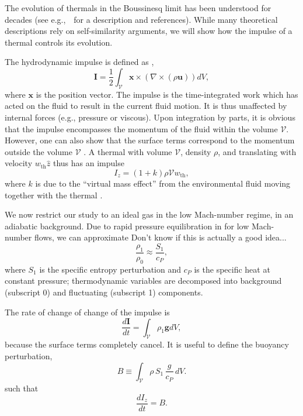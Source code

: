 \documentclass[twocolumn, amsmath, amsfonts, amssymb, trackchanges]{aastex62}
\newcommand{\grad}{\ensuremath{\nabla}}
\newcommand{\dl}[1]{{\color{blue} #1}}
\newcommand{\LJ}{\citetalias{lecoanet&jeevanjee2018}}
\begin{document}
The evolution of thermals in the Boussinesq limit has been understood for decades (see e.g.,~\LJ\, for a description and references).
While many theoretical descriptions rely on self-similarity arguments, we will show how the impulse of a thermal controls its evolution.

The hydrodynamic impulse is defined as \citep{shivamoggi2010},
\begin{equation}
\bm{I} = \frac{1}{2}\int_{\mathcal{V}} \bm{x}\times(\grad\times(\rho\bm{u}))dV,
\end{equation}
where $\bm{x}$ is the position vector. 
The impulse is the time-integrated work which has acted on the fluid to result in the current fluid motion.
It is thus unaffected by internal forces (e.g., pressure or viscous).
Upon integration by parts, it is obvious that the impulse encompasses the momentum of the fluid within the volume $\mathcal{V}$.
However, one can also show that the surface terms correspond to the momentum outside the volume $\mathcal{V}$ \citep[e.g.][]{Akhmetov2009}.
A thermal with volume $\mathcal{V}$, density $\rho$, and translating with velocity $w_{\text{th}} \hat{z}$ thus has an impulse
\begin{equation}\label{eqn:momentum}
I_z = (1+k) \rho \mathcal{V} w_{\text{th}},
\end{equation}
where $k$ is due to the ``virtual mass effect'' from the environmental fluid moving together with the thermal \citep{tarshish&all2018}.

We now restrict our study to an ideal gas in the low Mach-number regime, in an adiabatic background.
Due to rapid pressure equilibration in for low Mach-number flows, we can approximate \dl{Don't know if this is actually a good idea...}
\begin{equation*}
\frac{\rho_1}{\rho_0} \approx \frac{S_1}{c_P},
\end{equation*}
where $S_1$ is the specific entropy perturbation and $c_P$ is the specific heat at constant pressure; thermodynamic variables are decomposed into background (subscript 0) and fluctuating (subscript 1) components.

The rate of change of change of the impulse is
\begin{equation*}
\frac{d\bm{I}}{d t} = \int_\mathcal{V} \rho_1 \bm{g} dV,
\end{equation*}
because the surface terms completely cancel.
It is useful to define the buoyancy perturbation,
\begin{equation}
B \equiv \int_{\mathcal{V}} \rho\, S_1\, \frac{g}{c_P}\, dV.
\label{eqn:tot_buoyancy}
\end{equation}
such that
\begin{equation}
\frac{d I_z}{d t} = B.
\label{eqn:change_in_impulse}
\end{equation}
\end{document}
